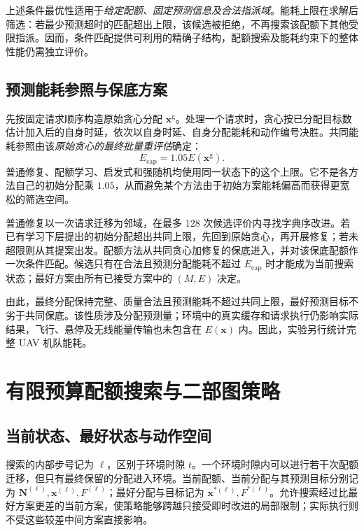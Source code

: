 上述条件最优性适用于\emph{给定配额、固定预测信息及合法指派域}。能耗上限在求解后筛选：若最少预测超时的匹配超出上限，该候选被拒绝，不再搜索该配额下其他受限指派。因而，条件匹配提供可利用的精确子结构，配额搜索及能耗约束下的整体性能仍需独立评价。

\subsection{预测能耗参照与保底方案}

先按固定请求顺序构造原始贪心分配 $\mathbf x^{\mathrm g}$。处理一个请求时，贪心按已分配目标数估计加入后的自身时延，依次以自身时延、自身分配能耗和动作编号决胜。共同能耗参照由该\emph{原始贪心的最终批量重评估}确定：
\begin{equation}
 E_{\mathrm{cap}}=1.05E(\mathbf x^{\mathrm g}).
 \label{legacy:eq:ch5-energy-cap}
\end{equation}
普通修复、配额学习、启发式和强随机均使用同一状态下的这个上限。它不是各方法自己的初始分配乘 $1.05$，从而避免某个方法由于初始方案能耗偏高而获得更宽松的筛选空间。

普通修复以一次请求迁移为邻域，在最多 $128$ 次候选评价内寻找字典序改进。若已有学习下层提出的初始分配超出共同上限，先回到原始贪心，再开展修复；若未超限则从其提案出发。配额方法从共同贪心加修复的保底进入，并对该保底配额作一次条件匹配。候选只有在合法且预测分配能耗不超过 $E_{\mathrm{cap}}$ 时才能成为当前搜索状态；最好方案由所有已接受方案中的 $(M,E)$ 决定。

由此，最终分配保持完整、质量合法且预测能耗不超过共同上限，最好预测目标不劣于共同保底。该性质涉及分配预测量；环境中的真实缓存和请求执行仍影响实际结果，飞行、悬停及无线能量传输也未包含在 $E(\mathbf x)$ 内。因此，实验另行统计完整 UAV 机队能耗。

\section{有限预算配额搜索与二部图策略}
\label{legacy:sec:ch5-search}

\subsection{当前状态、最好状态与动作空间}

搜索的内部步号记为 $\ell$，区别于环境时隙 $t$。一个环境时隙内可以进行若干次配额迁移，但只有最终保留的分配进入环境。当前配额、当前分配与其预测目标分别记为 $\mathbf N^{(\ell)},\mathbf x^{(\ell)},F^{(\ell)}$；最好分配与目标记为 $\mathbf x^{*(\ell)},F^{*(\ell)}$。允许搜索经过比最好方案更差的当前方案，使策略能够跨越只接受即时改进的局部限制；实际执行则不受这些较差中间方案直接影响。

